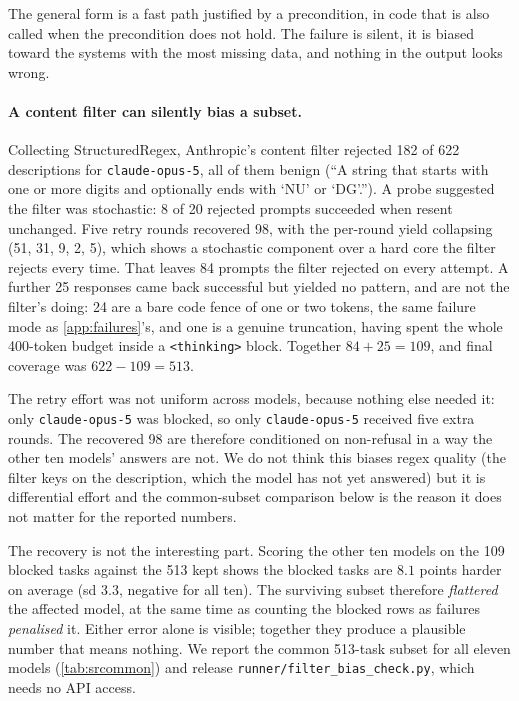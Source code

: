 \documentclass[11pt]{article}
\begin{document}
\begin{enumerate}
The general form is a fast path justified by a precondition, in code that is
also called when the precondition does not hold. The failure
is silent, it is biased toward the systems with the most missing data, and
nothing in the output looks wrong.
\end{enumerate}

\paragraph{A content filter can silently bias a subset.}
Collecting StructuredRegex, Anthropic's content filter rejected 182 of 622
descriptions for \texttt{claude-opus-5}, all of them benign (``A string that
starts with one or more digits and optionally ends with `NU' or `DG'.'').
A probe suggested the filter was stochastic: 8 of 20 rejected prompts
succeeded when resent unchanged. Five retry rounds recovered 98, with the
per-round yield collapsing (51, 31, 9, 2, 5), which shows a stochastic
component over a hard core the filter rejects every time. That leaves 84
prompts the filter rejected on every attempt. A further 25 responses came back
successful but yielded no pattern, and are not the filter's doing: 24 are a
bare code fence of one or two tokens, the same failure mode as
\cref{app:failures}'s, and one is a genuine truncation, having spent the whole
400-token budget inside a \texttt{<thinking>} block. Together
$84 + 25 = 109$, and final coverage was $622 - 109 = 513$.

The retry effort was not uniform across models, because nothing else needed
it: only \texttt{claude-opus-5} was blocked, so only \texttt{claude-opus-5}
received five extra rounds. The recovered 98 are therefore conditioned on
non-refusal in a way the other ten models' answers are not. We do not think
this biases regex quality (the filter keys on the description, which the
model has not yet answered) but it is differential effort and the
common-subset comparison below is the reason it does not matter for the
reported numbers.

The recovery is not the interesting part. Scoring the other ten models on the
109 blocked tasks against the 513 kept shows the blocked tasks are
$8.1$ points harder on average (sd $3.3$, negative for all ten). The
surviving subset therefore \emph{flattered} the affected model, at the same
time as counting the blocked rows as failures \emph{penalised} it. Either
error alone is visible; together they produce a plausible number that means
nothing. We report the common 513-task subset for all eleven models
(\cref{tab:srcommon}) and release \texttt{runner/filter\_bias\_check.py},
which needs no API access.
\end{document}
